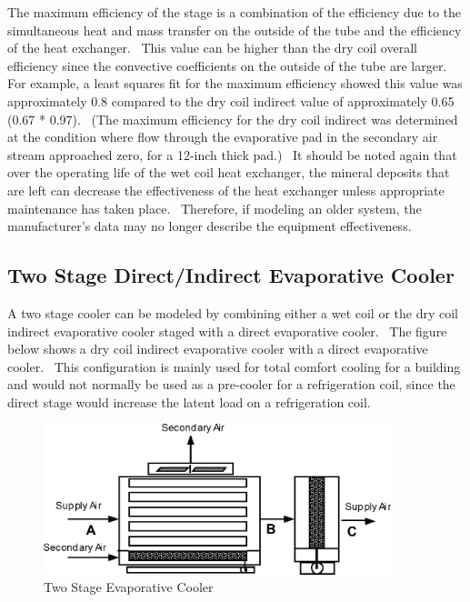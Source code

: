 The maximum efficiency of the stage is a combination of the efficiency due to the simultaneous heat and mass transfer on the outside of the tube and the efficiency of the heat exchanger.~ This value can be higher than the dry coil overall efficiency since the convective coefficients on the outside of the tube are larger.~ For example, a least squares fit for the maximum efficiency showed this value was approximately 0.8 compared to the dry coil indirect value of approximately 0.65 (0.67 * 0.97).~ (The maximum efficiency for the dry coil indirect was determined at the condition where flow through the evaporative pad in the secondary air stream approached zero, for a 12-inch thick pad.)~ It should be noted again that over the operating life of the wet coil heat exchanger, the mineral deposits that are left can decrease the effectiveness of the heat exchanger unless appropriate maintenance has taken place.~ Therefore, if modeling an older system, the manufacturer's data may no longer describe the equipment effectiveness.

\subsection{Two Stage Direct/Indirect Evaporative Cooler}\label{two-stage-directindirect-evaporative-cooler}

A two stage cooler can be modeled by combining either a wet coil or the dry coil indirect evaporative cooler staged with a direct evaporative cooler.~ The figure below shows a dry coil indirect evaporative cooler with a direct evaporative cooler.~ This configuration is mainly used for total comfort cooling for a building and would not normally be used as a pre-cooler for a refrigeration coil, since the direct stage would increase the latent load on a refrigeration coil.

\begin{figure}[hbtp] %
\centering
\includegraphics[width=0.9\textwidth, height=0.9\textheight, keepaspectratio=true]{media/image4806.png}
\caption{Two Stage Evaporative Cooler \protect \label{fig:two-stage-evaporative-cooler}}
\end{figure}

